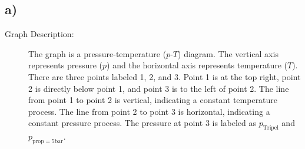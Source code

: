 

\subsection*{a)}

\begin{description}
    \item[Graph Description:] The graph is a pressure-temperature ($p$-$T$) diagram. The vertical axis represents pressure ($p$) and the horizontal axis represents temperature ($T$). There are three points labeled 1, 2, and 3. Point 1 is at the top right, point 2 is directly below point 1, and point 3 is to the left of point 2. The line from point 1 to point 2 is vertical, indicating a constant temperature process. The line from point 2 to point 3 is horizontal, indicating a constant pressure process. The pressure at point 3 is labeled as $p_{\text{Tripel}}$ and $p_{\text{prop}=5\text{bar}}$.
\end{description}